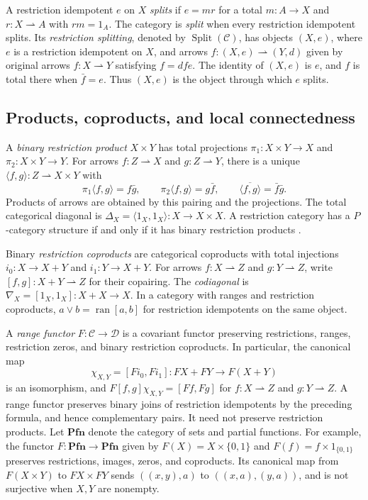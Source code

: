 \documentclass[11pt]{article}
\newcommand{\Pfn}{\mathbf{Pfn}}
\newcommand{\ran}{\operatorname{ran}}
\begin{document}
A restriction idempotent $e$ on $X$ \emph{splits} if
$e=mr$ for a total $m:A\to X$ and $r:X\rightharpoonup A$
with $rm=1_A$. The category is \emph{split} when every restriction
idempotent splits.
Its \emph{restriction splitting}, denoted by
$\operatorname{Split}(\mathcal C)$, has objects $(X,e)$, where $e$ is a
restriction idempotent on $X$, and arrows
$f:(X,e)\rightharpoonup(Y,d)$ given by original arrows
$f:X\rightharpoonup Y$ satisfying $f=dfe$.
The identity of $(X,e)$ is $e$, and $f$ is total there when
$\bar f=e$. Thus $(X,e)$ is the object through which $e$ splits.

\subsection{Products, coproducts, and local connectedness}

A \emph{binary restriction product} $X\times Y$ has total
projections $\pi_1:X\times Y\to X$ and $\pi_2:X\times Y\to Y$.
For arrows $f:Z\rightharpoonup X$ and $g:Z\rightharpoonup Y$,
there is a unique $\langle f,g\rangle:Z\rightharpoonup X\times Y$
with
\[
 \pi_1\langle f,g\rangle=f\bar g,\qquad
 \pi_2\langle f,g\rangle=g\bar f,\qquad
 \overline{\langle f,g\rangle}=\bar f\bar g.
\]
Products of arrows are obtained by this pairing and the projections.
The total categorical diagonal is
$\Delta_X=\langle1_X,1_X\rangle:X\to X\times X$.
A restriction category has a $P$-category structure if and only if
it has binary restriction products
\cite[Proposition 4.5]{CockettLackIII}.

Binary \emph{restriction coproducts} are categorical coproducts with
total injections $i_0:X\to X+Y$ and $i_1:Y\to X+Y$.
For arrows $f:X\rightharpoonup Z$ and $g:Y\rightharpoonup Z$,
write $[f,g]:X+Y\rightharpoonup Z$ for their copairing.
The \emph{codiagonal} is
$\nabla_X=[1_X,1_X]:X+X\to X$.
In a category with ranges and restriction coproducts,
$a\vee b=\ran[a,b]$ for restriction idempotents on the same object.

A \emph{range functor} $F:\mathcal C\to\mathcal D$ is a covariant
functor preserving restrictions, ranges, restriction zeros, and binary
restriction coproducts. In particular, the canonical map
\[
 \chi_{X,Y}=[F i_0,F i_1]:FX+FY\longrightarrow F(X+Y)
\]
is an isomorphism, and
$F[f,g]\chi_{X,Y}=[Ff,Fg]$ for $f:X\rightharpoonup Z$ and
$g:Y\rightharpoonup Z$. A range functor preserves binary
joins of restriction idempotents by the preceding formula, and hence
complementary pairs.
It need not preserve restriction products. Let $\Pfn$ denote the
category of sets and partial functions. For example, the functor
$F:\Pfn\to\Pfn$ given by $F(X)=X\times\{0,1\}$ and
$F(f)=f\times1_{\{0,1\}}$ preserves restrictions, images, zeros,
and coproducts. Its canonical map from $F(X\times Y)$ to
$FX\times FY$ sends $((x,y),a)$ to $((x,a),(y,a))$, and is
not surjective when $X,Y$ are nonempty.
\end{document}
